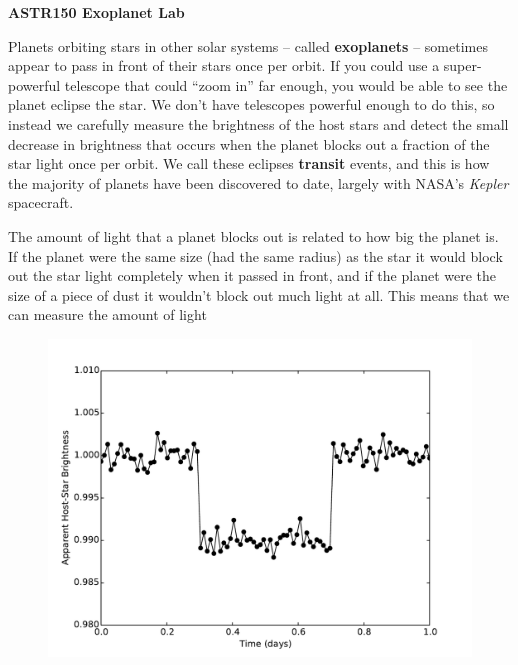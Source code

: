\documentclass[12pt]{article}
\begin{document}

\begin{center}
\bf ASTR150 Exoplanet Lab
\end{center}

Planets orbiting stars in other solar systems -- called {\bf exoplanets} -- sometimes appear to pass in front of their stars once per orbit. If you could use a super-powerful telescope that could ``zoom in'' far enough, you would be able to see the planet eclipse the star. We don't have telescopes powerful enough to do this, so instead we carefully measure the brightness of the host stars and detect the small decrease in brightness that occurs when the planet blocks out a fraction of the star light once per orbit.  We call these eclipses {\bf transit} events, and this is how the majority of planets have been discovered to date, largely with NASA's {\it Kepler} spacecraft. 

The amount of light that a planet blocks out is related to how big the planet is. If the planet were the same size (had the same radius) as the star it would block out the star light completely when it passed in front, and if the planet were the size of a piece of dust it wouldn't block out much light at all. This means that we can measure the amount of light 

\begin{figure}[h!]
\centering
\includegraphics[scale=0.5]{plots/faketransit.pdf}
\end{figure}
\end{document}
